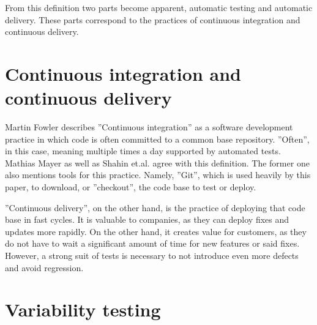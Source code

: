 From this definition two parts become apparent, automatic testing and automatic delivery.
These parts correspond to the practices of continuous integration and continuous delivery.

\section{Continuous integration and continuous delivery}\label{sec:continuous integration and continuous delivery}

Martin Fowler describes ''Continuous integration'' as a software development practice in which code is often committed to a common base repository\cite{ContinuousIntegration}.
''Often'', in this case, meaning multiple times a day supported by automated tests.
Mathias Mayer\cite{ContinuousIntegrationAndItsTools} as well as Shahin et.al.\cite{ContinuousIntegrationDeliveryAndDeploymentASystematicReviewOnApproaches} agree with this definition.
The former one also mentions tools for this practice.
Namely, ''Git'', which is used heavily by this paper, to download, or ''checkout'', the code base to test or deploy.

''Continuous delivery'', on the other hand, is the practice of deploying that code base in fast cycles\cite{ContinuousDeliveryHugeBenefitsButChallengesToo}.
It is valuable to companies, as they can deploy fixes and updates more rapidly.
On the other hand, it creates value for customers, as they do not have to wait a significant amount of time for new features or said fixes.
However, a strong suit of tests is necessary to not introduce even more defects and avoid regression.

\section{Variability testing}\label{sec:variability testing}